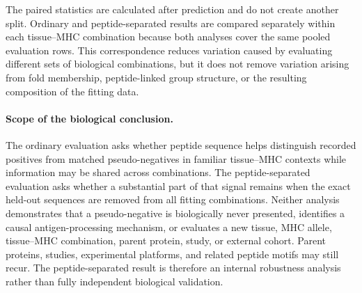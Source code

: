 The paired statistics are calculated after prediction and do not create another split. Ordinary and peptide-separated results are compared separately within each tissue--MHC combination because both analyses cover the same pooled evaluation rows. This correspondence reduces variation caused by evaluating different sets of biological combinations, but it does not remove variation arising from fold membership, peptide-linked group structure, or the resulting composition of the fitting data.

\paragraph{Scope of the biological conclusion.}
The ordinary evaluation asks whether peptide sequence helps distinguish recorded positives from matched pseudo-negatives in familiar tissue--MHC contexts while information may be shared across combinations. The peptide-separated evaluation asks whether a substantial part of that signal remains when the exact held-out sequences are removed from all fitting combinations. Neither analysis demonstrates that a pseudo-negative is biologically never presented, identifies a causal antigen-processing mechanism, or evaluates a new tissue, MHC allele, tissue--MHC combination, parent protein, study, or external cohort. Parent proteins, studies, experimental platforms, and related peptide motifs may still recur. The peptide-separated result is therefore an internal robustness analysis rather than fully independent biological validation.
